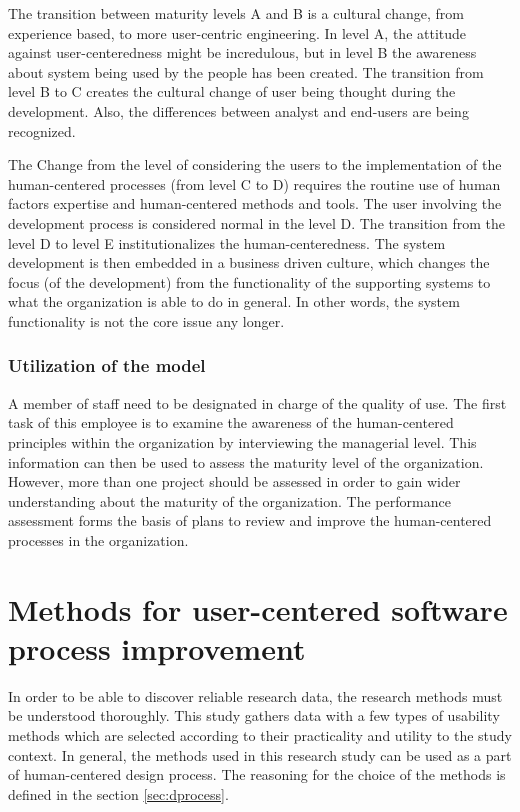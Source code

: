 \documentclass[12pt,a4paper,oneside,pdftex]{report}
\begin{document}
The transition between maturity levels A and B is a cultural change, from experience based, to more user-centric engineering. In level A, the attitude against user-centeredness might be incredulous, but in level B the awareness about system being used by the people has been created. The transition from level B to C creates the cultural change of user being thought during the development. Also, the differences between analyst and end-users are being recognized. \cite{RefWorks:30}

The Change from the level of considering the users to the implementation of the human-centered processes  (from level C to D) requires the routine use of human factors expertise and human-centered methods and tools. The user involving the development process is considered normal in the level D. The transition from the level D to level E institutionalizes the human-centeredness. The system development is then embedded in a business driven culture, which changes the focus (of the development) from the functionality of the supporting  systems to what the organization is able to do in general. In other words, the system functionality is not the core issue any longer.  \cite{RefWorks:30}

\subsection{Utilization of the model}

A member of staff need to be designated in charge of the quality of use. The first task of this employee is to examine the awareness of the human-centered principles within the organization by interviewing the managerial level. This information can then be used to assess the maturity level of the organization. However, more than one project should be assessed in order to gain wider understanding about the maturity of the organization. The performance assessment forms the basis of plans to review and improve the human-centered processes in the organization. \cite{RefWorks:30}

\chapter{Methods for user-centered software process improvement}
\label{chapter:methods}


In order to be able to discover reliable research data, the research methods must be understood thoroughly. This study gathers data with a few types of usability methods which are selected according to their practicality and utility to the study context. In general, the methods used in this research study can be used as a part of human-centered design process. The reasoning for the choice of the methods is defined in the section \ref{sec:dprocess}. 
\end{document}
